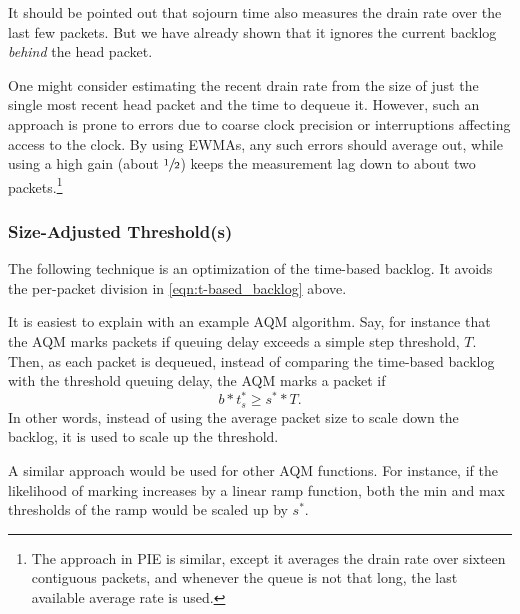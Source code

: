 It should be pointed out that sojourn time also measures the drain rate over the last few packets. But we have already shown that it ignores the current backlog \emph{behind} the head packet.

One might consider estimating the recent drain rate from the size of just the single most recent head packet and the time to dequeue it. However, such an approach is prone to errors due to coarse clock precision or interruptions affecting access to the clock. By using EWMAs, any such errors should average out, while using a high gain (about \(\sfrac{1}{2}\)) keeps the measurement lag down to about two packets.\footnote{The approach in PIE is similar, except it averages the drain rate over sixteen contiguous packets, and whenever the queue is not that long, the last available average rate is used.}

\subsubsection{Size-Adjusted Threshold(s)}\label{sec:time-adj_thresh}

The following technique is an optimization of the time-based backlog. It avoids the per-packet division in \autoref{eqn:t-based_backlog} above.

It is easiest to explain with an example AQM algorithm. Say, for instance that the AQM marks packets if queuing delay exceeds a simple step threshold, \(T\). Then, as each packet is dequeued, instead of comparing the time-based backlog with the threshold queuing delay, the AQM marks a packet if
\begin{equation}
	b * t_s^* \ge s^* * T.
\end{equation}
In other words, instead of using the average packet size to scale down the backlog, it is used to scale up the threshold.

A similar approach would be used for other AQM functions. For instance, if the likelihood of marking increases by a linear ramp function, both the min and max thresholds of the ramp would be scaled up by \(s^*\).


